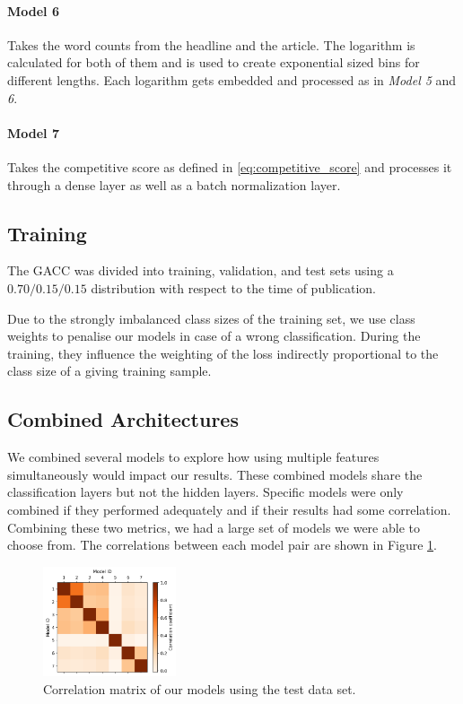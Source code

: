 \paragraph{Model 6} 
Takes the word counts from the headline and the article.
The logarithm is calculated for both of them and is used to create exponential sized bins for different lengths.
Each logarithm gets embedded and processed as in \textit{Model 5} and \textit{6}.

\paragraph{Model 7} 
Takes the competitive score as defined in \autoref{eq:competitive_score} and processes it through a dense layer as well as a batch normalization layer.

\subsection{Training}
The GACC was divided into training, validation, and test sets using a $0.70/0.15/0.15$  distribution with respect to the time of publication.

Due to the strongly imbalanced class sizes of the training set, we use class weights to penalise our models in case of a wrong classification.
During the training, they influence the weighting of the loss indirectly proportional to the class size of a giving training sample.

\subsection{Combined Architectures}
We combined several models to explore how using multiple features simultaneously would impact our results.
These combined models share the classification layers but not the hidden layers.
Specific models were only combined if they performed adequately and if their results had some correlation.
Combining these two metrics, we had a large set of models we were able to choose from.
The correlations between each model pair are shown in Figure \ref{fig:correlation_matrix}. 

\begin{figure}[h]
	\includegraphics[width=0.35\textwidth]{fig/correlations.png}
	\caption{\textmd{Correlation matrix of our models using the test data set.}}
	\label{fig:correlation_matrix}
\end{figure}
